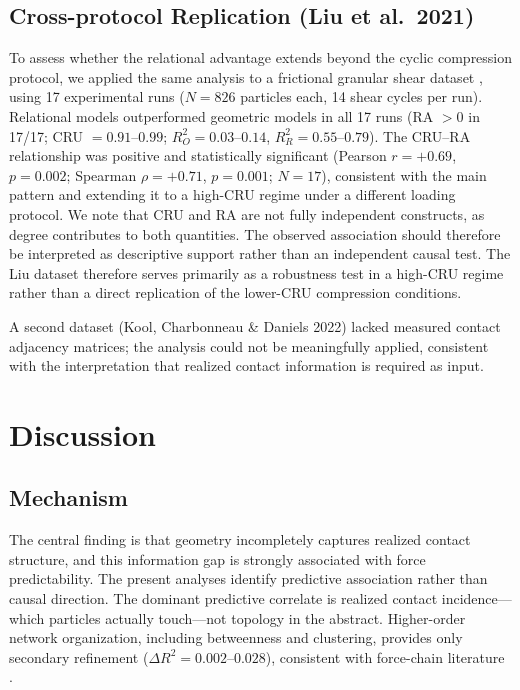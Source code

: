 \documentclass[11pt,a4paper]{article}
\begin{document}
\subsection{Cross-protocol Replication (Liu et al.\ 2021)}\label{sec:crossprotocol}
To assess whether the relational advantage extends beyond the cyclic compression protocol, we applied the same analysis to a frictional granular shear dataset \cite{liu2021}, using 17 experimental runs ($N=826$ particles each, 14 shear cycles per run).
Relational models outperformed geometric models in all 17 runs (RA $> 0$ in 17/17; CRU $= 0.91$--$0.99$; $R^2_O = 0.03$--$0.14$, $R^2_R = 0.55$--$0.79$).
The CRU--RA relationship was positive and statistically significant (Pearson $r = +0.69$, $p = 0.002$; Spearman $\rho = +0.71$, $p = 0.001$; $N=17$), consistent with the main pattern and extending it to a high-CRU regime under a different loading protocol.
We note that CRU and RA are not fully independent constructs, as degree contributes to both quantities.
The observed association should therefore be interpreted as descriptive support rather than an independent causal test.
The Liu dataset therefore serves primarily as a robustness test in a high-CRU regime rather than a direct replication of the lower-CRU compression conditions.

A second dataset (Kool, Charbonneau \& Daniels 2022) lacked measured contact adjacency matrices; the analysis could not be meaningfully applied, consistent with the interpretation that realized contact information is required as input.

\section{Discussion}

\subsection{Mechanism}

The central finding is that geometry incompletely captures realized contact structure, and this information gap is strongly associated with force predictability.
The present analyses identify predictive association rather than causal direction.
The dominant predictive correlate is realized contact incidence---which particles actually touch---not topology in the abstract.
Higher-order network organization, including betweenness and clustering, provides only secondary refinement ($\Delta R^2 = 0.002$--$0.028$), consistent with force-chain literature \cite{radjai1998,peters2005,bassett2015,ostojic2006}.
\end{document}
